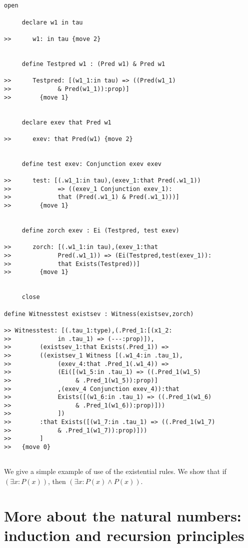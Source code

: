 \documentclass[12pt]{article}
\begin{document}
\begin{verbatim}


open

     declare w1 in tau

>>      w1: in tau {move 2}


     define Testpred w1 : (Pred w1) & Pred w1

>>      Testpred: [(w1_1:in tau) => ((Pred(w1_1) 
>>             & Pred(w1_1)):prop)]
>>        {move 1}


     declare exev that Pred w1

>>      exev: that Pred(w1) {move 2}


     define test exev: Conjunction exev exev

>>      test: [(.w1_1:in tau),(exev_1:that Pred(.w1_1)) 
>>             => ((exev_1 Conjunction exev_1):
>>             that (Pred(.w1_1) & Pred(.w1_1)))]
>>        {move 1}


     define zorch exev : Ei (Testpred, test exev)

>>      zorch: [(.w1_1:in tau),(exev_1:that 
>>             Pred(.w1_1)) => (Ei(Testpred,test(exev_1)):
>>             that Exists(Testpred))]
>>        {move 1}


     close

define Witnesstest existsev : Witness(existsev,zorch)

>> Witnesstest: [(.tau_1:type),(.Pred_1:[(x1_2:
>>             in .tau_1) => (---:prop)]),
>>        (existsev_1:that Exists(.Pred_1)) => 
>>        ((existsev_1 Witness [(.w1_4:in .tau_1),
>>             (exev_4:that .Pred_1(.w1_4)) => 
>>             (Ei([(w1_5:in .tau_1) => ((.Pred_1(w1_5) 
>>                  & .Pred_1(w1_5)):prop)]
>>             ,(exev_4 Conjunction exev_4)):that 
>>             Exists([(w1_6:in .tau_1) => ((.Pred_1(w1_6) 
>>                  & .Pred_1(w1_6)):prop)]))
>>             ])
>>        :that Exists([(w1_7:in .tau_1) => ((.Pred_1(w1_7) 
>>             & .Pred_1(w1_7)):prop)]))
>>        ]
>>   {move 0}


\end{verbatim}

We give a simple example of use of the existential rules.  We show that if $(\exists x:P(x))$, then $(\exists x:P(x) \wedge P(x))$.

\section{More about the natural numbers:  induction and recursion principles}
\end{document}
